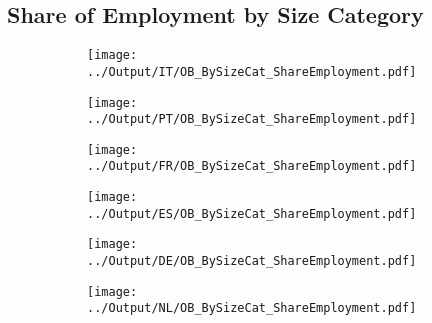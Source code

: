 \documentclass[12pt,notitlepage]{article}
\begin{document}
\subsection{Share of Employment by Size Category}
\begin{figure}[!htpb]
\centering
\begin{subfigure}{.49\textwidth}
    \centering
 \texttt{[image: ../Output/IT/OB\_BySizeCat\_ShareEmployment.pdf]}
\end{subfigure}%
\begin{subfigure}{.49\textwidth}
    \centering
 \texttt{[image: ../Output/PT/OB\_BySizeCat\_ShareEmployment.pdf]}
\end{subfigure}
\begin{subfigure}{.49\textwidth}
    \centering
 \texttt{[image: ../Output/FR/OB\_BySizeCat\_ShareEmployment.pdf]}
\end{subfigure}%
\begin{subfigure}{.49\textwidth}
    \centering
 \texttt{[image: ../Output/ES/OB\_BySizeCat\_ShareEmployment.pdf]}
\end{subfigure}
\begin{subfigure}{.49\textwidth}
    \centering
 \texttt{[image: ../Output/DE/OB\_BySizeCat\_ShareEmployment.pdf]}
\end{subfigure}
\begin{subfigure}{.49\textwidth}
    \centering
 \texttt{[image: ../Output/NL/OB\_BySizeCat\_ShareEmployment.pdf]}
\end{subfigure}
\end{figure}
\clearpage
\end{document}
